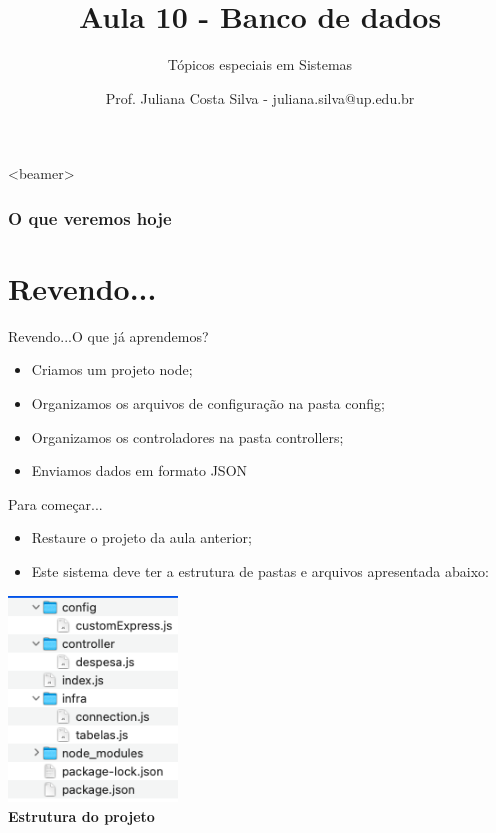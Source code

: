 \documentclass{beamer}
\title{Aula 10  - Banco de dados}
\subtitle{Tópicos especiais em Sistemas}
\author{Prof. Juliana Costa Silva - juliana.silva@up.edu.br}
\begin{document}
  \frame[c]{\maketitle}
      \begin{frame}<beamer>
      \frametitle{O que veremos hoje}
      \tableofcontents
    \end{frame}
    \section{Revendo...}
    \begin{frame}{Revendo...}{O que já aprendemos?}
      
      \begin{itemize}
            \item Criamos um projeto node;
            \item Organizamos os arquivos de configuração na pasta config;
            \item Organizamos os controladores na pasta controllers;
            \item Enviamos dados em formato JSON
       \end{itemize}
     \end{frame}
\begin{frame}[label=proof]{Para começar...}
	\begin{itemize}
	\item Restaure o projeto da aula anterior;
	\item Este sistema deve ter a estrutura de pastas e arquivos apresentada abaixo:
	\end{itemize}
	\begin{center}
	    \includegraphics[width=45mm]{resources/aula10_1.png} \\ \tiny{\textbf{Estrutura do projeto}}
	\end{center}
    \end{frame}
\end{document}
